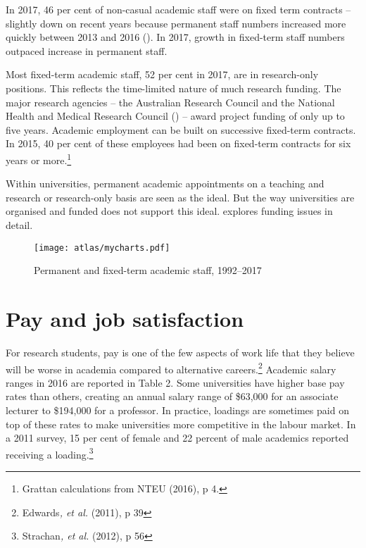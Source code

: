 \documentclass{grattan}
\begin{document}
In 2017, 46 per cent of non-casual academic staff were on fixed term contracts -- slightly down on recent years because permanent staff numbers increased more quickly between 2013 and 2016 (). In 2017, growth in fixed-term staff numbers outpaced increase in permanent staff.

Most fixed-term academic staff, 52 per cent in 2017, are in research-only positions. This reflects the time-limited nature of much research funding. The major research agencies -- the Australian Research Council and the National Health and Medical Research Council () -- award project funding of only up to five years. Academic employment can be built on successive fixed-term contracts. In 2015, 40 per cent of these employees had been on fixed-term contracts for six years or more.\footnote{Grattan calculations from NTEU (2016), p 4.}

Within universities, permanent academic appointments on a teaching and research or research-only basis are seen as the ideal. But the way universities are organised and funded does not support this ideal.  explores funding issues in detail.

    \begin{figure} %
    \caption{Permanent and fixed-term academic staff, 1992--2017}\label{fig:permanent-and-fixedterm-academic-staff-19922017}
    \texttt{[image: atlas/mycharts.pdf]}
    \end{figure}


%
\section{Pay and job satisfaction}\label{sec:pay-and-job-satisfaction}

For research students, pay is one of the few aspects of work life that they believe will be worse in academia compared to alternative careers.\footnote{Edwards\emph{, et al.} (2011), p 39} Academic salary ranges in 2016 are reported in Table 2. Some universities have higher base pay rates than others, creating an annual salary range of \$63,000 for an associate lecturer to \$194,000 for a professor. In practice, loadings are sometimes paid on top of these rates to make universities more competitive in the labour market. In a 2011 survey, 15 per cent of female and 22 percent of male academics reported receiving a loading.\footnote{Strachan\emph{, et al.} (2012), p 56}
\end{document}
